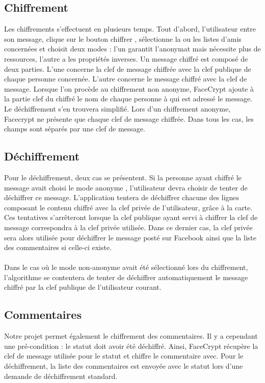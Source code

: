 \documentclass[a4paper,11pt,french]{article}
\begin{document}
\subsection{Chiffrement}
Les chiffrements s'effectuent en plusieurs temps. Tout d'abord, l'utilisateur 
entre son message, clique sur le bouton \og chiffrer \fg{}, sélectionne la ou les
listes d'amis concernées et choisit deux modes : l'un garantit l'anonymat mais
nécessite plus de ressources, l'autre a les propriétés inverses. Un message
chiffré est composé de deux parties. L'une concerne la clef de message chiffrée
avec la clef publique de chaque personne concernée. L'autre concerne le message
chiffré avec la clef de message. Lorsque l'on procède au chiffrement non anonyme,
FaceCrypt ajoute à la partie clef du chiffré le nom de chaque personne à qui est
adressé le message. Le déchiffrement s'en trouvera simplifié. Lors d'un
chiffrement anonyme, Facecrypt ne présente que chaque clef de message chiffrée.
Dans tous les cas, les champs sont séparés par une clef de message.

\subsection{Déchiffrement}
Pour le déchiffrement, deux cas se présentent. Si la personne ayant chiffré le
message avait choisi le mode \og anonyme \fg{}, l'utilisateur devra
choisir de tenter de déchiffrer ce message. L'application tentera de déchiffrer
chacune des lignes composant le contenu chiffré avec la clef privée de
l'utilisateur, grâce à la carte. Ces tentatives
s'arrêteront lorsque la clef publique ayant servi à chiffrer la clef de message
correspondra à la clef privée utilisée. Dans ce dernier cas, la clef privée sera
alors utilisée pour déchiffrer le message posté sur Facebook ainsi que la liste
des commentaires si celle-ci existe.

\paragraph{}
Dans le cas où le mode \og non-anonyme \fg{} avait été sélectionné lors du
chiffrement, l'algorithme se contentera de tenter de déchiffrer automatiquement
le message chiffré par la clef publique de l'utilisateur courant.

\subsection{Commentaires}
Notre projet permet également le chiffrement des commentaires. Il y a cependant
une pré-condition : le statut doit avoir été déchiffré. Ainsi, FaceCrypt récupère
la clef de message utilisée pour le statut et chiffre le commentaire avec. Pour
le déchiffrement, la liste des commentaires est envoyée avec le statut lors d'une
demande de déchiffrement standard.
 
\end{document}
